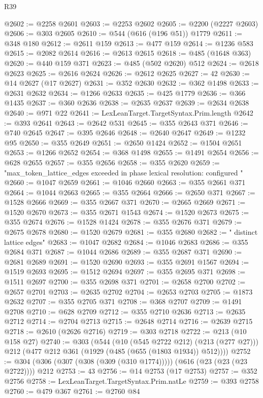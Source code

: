 \begin{lexlean}{R39}
\begin{coremodule}
@2602 := @2258 @2601
@2603 := @2253 @2602
@2605 := @2200 (@2227 @2603)
@2606 := @303 @2605
@2610 := @544 (@616 (@196 @51)) @1779
@2611 := @348 @180
@2612 := @2611 @159
@2613 := @477 @159
@2614 := @1236 @583
@2615 := @2082 @2614
@2616 := @2613 @2615
@2618 := @485 (@1648 @363)
@2620 := @440 @159 @371
@2623 := @485 (@502 @2620) @512
@2624 := @2618 @2623
@2625 := @2616 @2624
@2626 := @2612 @2625
@2627 := 42
@2630 := @14 @2627 (@17 @2627)
@2631 := @352 @2630
@2632 := @362 @1498
@2633 := @2631 @2632
@2634 := @1266 @2633
@2635 := @425 @1779
@2636 := @366 @1435
@2637 := @360 @2636
@2638 := @2635 @2637
@2639 := @2634 @2638
@2640 := @971 @22
@2641 := LexLeanTarget.TargetSyntax.Prim.length
@2642 := @393 @2641
@2643 := @2642 @531
@2645 := @355 @2643 @371
@2646 := @740 @2645
@2647 := @395 @2646
@2648 := @2640 @2647
@2649 := @1232 @95
@2650 := @355 @2649
@2651 := @2650 @1424
@2652 := @1504 @2651
@2653 := @1266 @2652
@2654 := @368 @1498
@2655 := @1491 @2654
@2656 := @628 @2655
@2657 := @355 @2656
@2658 := @355 @2620
@2659 := "max_token_lattice_edges exceeded in phase lexical resolution: configured "
@2660 := @1047 @2659
@2661 := @1046 @2660
@2663 := @355 @2661 @371
@2664 := @1044 @2663
@2665 := @355 @2664
@2666 := @2650 @371
@2667 := @1528 @2666
@2669 := @355 @2667 @371
@2670 := @2665 @2669
@2671 := @1520 @2670
@2673 := @355 @2671 @1543
@2674 := @1520 @2673
@2675 := @355 @2674
@2676 := @1528 @1424
@2678 := @355 @2676 @371
@2679 := @2675 @2678
@2680 := @1520 @2679
@2681 := @355 @2680
@2682 := " distinct lattice edges"
@2683 := @1047 @2682
@2684 := @1046 @2683
@2686 := @355 @2684 @371
@2687 := @1044 @2686
@2689 := @355 @2687 @371
@2690 := @2681 @2689
@2691 := @1520 @2690
@2693 := @355 @2691 @1567
@2694 := @1519 @2693
@2695 := @1512 @2694
@2697 := @355 @2695 @371
@2698 := @1511 @2697
@2700 := @355 @2698 @371
@2701 := @2658 @2700
@2702 := @2657 @2701
@2703 := @2635 @2702
@2704 := @2653 @2703
@2705 := @1873 @2632
@2707 := @355 @2705 @371
@2708 := @368 @2707
@2709 := @1491 @2708
@2710 := @628 @2709
@2712 := @355 @2710 @2636
@2713 := @2635 @2712
@2714 := @2704 @2713
@2715 := @2648 @2714
@2716 := @2639 @2715
@2718 := @2610 (@2626 @2716)
@2719 := @303 @2718
@2722 := @213 (@10 @158 @27)
@2740 := @303
    (@544
      (@10 (@545 @2722 @212) (@213 (@277 @27)))
      @212
      (@477 @212 @361 (@1929 (@485 (@655 (@1803 @1934)) @512))))
@2752 := @304 (@306 (@307 (@308 (@309 (@310 @1774))))) (@616 (@23 (@23 (@23 @2722)))) @212
@2753 := 43
@2756 := @14 @2753 (@17 @2753)
@2757 := @352 @2756
@2758 := LexLeanTarget.TargetSyntax.Prim.natLe
@2759 := @393 @2758
@2760 := @479 @367
@2761 := @2760 @84

\end{coremodule}
\end{lexlean}
